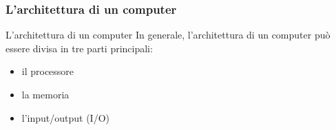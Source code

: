 \begin{frame}
	\frametitle{L'architettura di un computer}
	
	\begin{block}{L'architettura di un computer}
		In generale, l'architettura di un computer può essere divisa in tre parti principali:
		\begin{itemize}
			\item il processore
			\item la memoria
			\item l'input/output (I/O)
		\end{itemize}
	\end{block}
	
	
\end{frame}


